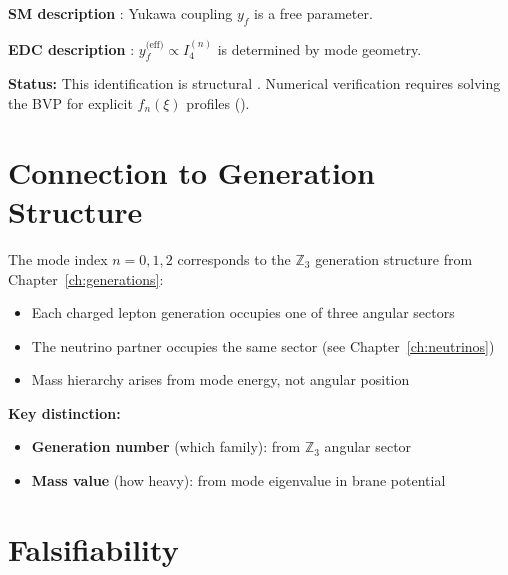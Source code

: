 \begin{tcolorbox}[colback=yellow!5!white, colframe=yellow!50!black,
    title=\textbf{Dictionary: EDC Overlap $\leftrightarrow$ SM Yukawa}]
\textbf{SM description} \tagBL{}: Yukawa coupling $y_f$ is a free parameter.

\textbf{EDC description} \tagDc{}: $y_f^{\text{(eff)}} \propto I_4^{(n)}$
is determined by mode geometry.

\textbf{Status:} This identification is structural \tagI{}. Numerical verification
requires solving the BVP for explicit $f_n(\xi)$ profiles ().
\end{tcolorbox}

\section{Connection to Generation Structure}
\label{sec:lepton_generations}

The mode index $n = 0, 1, 2$ corresponds to the $\mathbb{Z}_3$ generation
structure from Chapter~\ref{ch:generations}:

\begin{itemize}[nosep]
    \item Each charged lepton generation occupies one of three angular sectors
    \item The neutrino partner occupies the same sector (see Chapter~\ref{ch:neutrinos})
    \item Mass hierarchy arises from mode energy, not angular position
\end{itemize}

\textbf{Key distinction:}
\begin{itemize}[nosep]
    \item \textbf{Generation number} (which family): from $\mathbb{Z}_3$ angular sector
    \item \textbf{Mass value} (how heavy): from mode eigenvalue in brane potential
\end{itemize}

\section{Falsifiability}
\label{sec:lepton_falsify}

